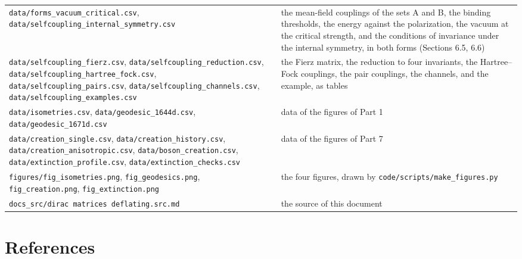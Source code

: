 \documentclass[
  10pt,
]{article}
\begin{document}
\begin{longtable}[]{@{}
  >{\raggedright\arraybackslash}p{}
  >{\raggedright\arraybackslash}p{}@{}}
\texttt{data/forms\_vacuum\_critical.csv},
\texttt{data/selfcoupling\_internal\_symmetry.csv} & the mean-field
couplings of the sets A and B, the binding thresholds, the energy
against the polarization, the vacuum at the critical strength, and the
conditions of invariance under the internal symmetry, in both forms
(Sections 6.5, 6.6) \\
\texttt{data/selfcoupling\_fierz.csv},
\texttt{data/selfcoupling\_reduction.csv},
\texttt{data/selfcoupling\_hartree\_fock.csv},
\texttt{data/selfcoupling\_pairs.csv},
\texttt{data/selfcoupling\_channels.csv},
\texttt{data/selfcoupling\_examples.csv} & the Fierz matrix, the
reduction to four invariants, the Hartree--Fock couplings, the pair
couplings, the channels, and the example, as tables \\
\texttt{data/isometries.csv}, \texttt{data/geodesic\_1644d.csv},
\texttt{data/geodesic\_1671d.csv} & data of the figures of Part 1 \\
\texttt{data/creation\_single.csv}, \texttt{data/creation\_history.csv},
\texttt{data/creation\_anisotropic.csv},
\texttt{data/boson\_creation.csv},
\texttt{data/extinction\_profile.csv},
\texttt{data/extinction\_checks.csv} & data of the figures of Part 7 \\
\texttt{figures/fig\_isometries.png}, \texttt{fig\_geodesics.png},
\texttt{fig\_creation.png}, \texttt{fig\_extinction.png} & the four
figures, drawn by \texttt{code/scripts/make\_figures.py} \\
\texttt{docs\_src/dirac\ matrices\ deflating.src.md} & the source of
this document \\
\end{longtable}

\hypertarget{references}{%
\section{References}\label{references}}
\end{document}
